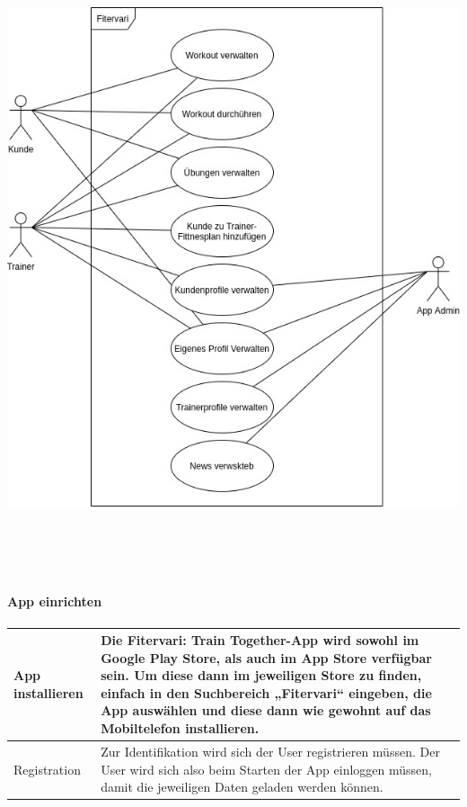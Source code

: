 \documentclass[12pt]{article}
\theoremstyle{definition}
\begin{document}
\includegraphics[width=15cm, height=18.5cm]{UseCase_Diagramm.jpg}

\newpage

\paragraph{App einrichten}
\begin{center}

\end{center}
\begin{center}
\begin{tabular}{| L{3cm} | C{12cm} |}
\hline
App installieren & Die Fitervari: Train Together-App wird sowohl im Google Play Store, als auch im App Store verfügbar sein. Um diese dann im jeweiligen Store zu finden, einfach in den Suchbereich „Fitervari“ eingeben, die App auswählen und diese dann wie gewohnt auf das Mobiltelefon installieren.\\

\hline
Registration & Zur Identifikation wird sich der User registrieren müssen. Der User wird sich also beim Starten der App einloggen müssen, damit die jeweiligen Daten geladen werden können.\\


\hline
\end{tabular}
\end{center}
\end{document}
